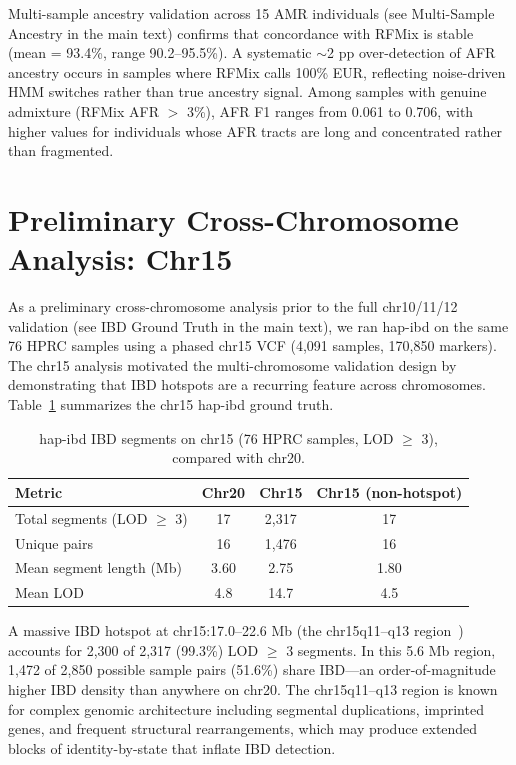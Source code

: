 \documentclass[11pt]{article}
\begin{document}
Multi-sample ancestry validation across 15 AMR individuals (see Multi-Sample Ancestry in the main text) confirms that concordance with RFMix is stable (mean = 93.4\%, range 90.2--95.5\%). A systematic $\sim$2 pp over-detection of AFR ancestry occurs in samples where RFMix calls 100\% EUR, reflecting noise-driven HMM switches rather than true ancestry signal. Among samples with genuine admixture (RFMix AFR $>$ 3\%), AFR F1 ranges from 0.061 to 0.706, with higher values for individuals whose AFR tracts are long and concentrated rather than fragmented.

\section{Preliminary Cross-Chromosome Analysis: Chr15}
\label{sec:supp_chr15}

As a preliminary cross-chromosome analysis prior to the full chr10/11/12 validation (see IBD Ground Truth in the main text), we ran hap-ibd on the same 76 HPRC samples using a phased chr15 VCF (4,091 samples, 170,850 markers). The chr15 analysis motivated the multi-chromosome validation design by demonstrating that IBD hotspots are a recurring feature across chromosomes. Table~\ref{tab:chr15_overview} summarizes the chr15 hap-ibd ground truth.

\begin{table}[ht]
\centering
\caption{hap-ibd IBD segments on chr15 (76 HPRC samples, LOD $\geq$ 3), compared with chr20.}
\label{tab:chr15_overview}
\begin{tabular}{lccc}
\hline
\textbf{Metric} & \textbf{Chr20} & \textbf{Chr15} & \textbf{Chr15 (non-hotspot)} \\
\hline
Total segments (LOD $\geq$ 3) & 17 & 2,317 & 17 \\
Unique pairs & 16 & 1,476 & 16 \\
Mean segment length (Mb) & 3.60 & 2.75 & 1.80 \\
Mean LOD & 4.8 & 14.7 & 4.5 \\
\hline
\end{tabular}
\end{table}

A massive IBD hotspot at chr15:17.0--22.6 Mb (the chr15q11--q13 region~\cite{nicholls2001prader_willi}) accounts for 2,300 of 2,317 (99.3\%) LOD $\geq$ 3 segments. In this 5.6 Mb region, 1,472 of 2,850 possible sample pairs (51.6\%) share IBD---an order-of-magnitude higher IBD density than anywhere on chr20. The chr15q11--q13 region is known for complex genomic architecture including segmental duplications, imprinted genes, and frequent structural rearrangements, which may produce extended blocks of identity-by-state that inflate IBD detection.
\end{document}
